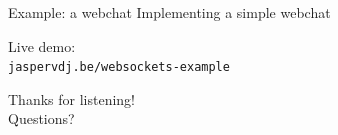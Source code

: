 \documentclass[20pt]{beamer}
\newcommand{\vspaced}{
    \vspace{5mm}
}
\begin{document}
\begin{frame}[fragile]{Example: a webchat}
    Implementing a simple webchat \\
    \vspaced
    Live demo: \\
    \small{\verb#jaspervdj.be/websockets-example#}
\end{frame}


\begin{frame}[plain]
    \begin{center}
    \small{Thanks for listening!} \\
    \huge{Questions?}
    \end{center}
\end{frame}

\end{document}
